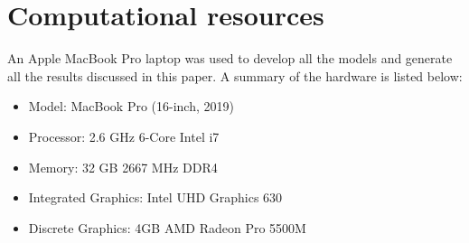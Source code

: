 
\section{Computational resources}

An Apple MacBook Pro laptop was used to develop all the models and generate all the results discussed in this paper. A summary of the hardware is listed below:

\begin{itemize}
    \item Model: MacBook Pro (16-inch, 2019)
    \item Processor: 2.6 GHz 6-Core Intel i7
    \item Memory: 32 GB 2667 MHz DDR4
    \item Integrated Graphics: Intel UHD Graphics 630
    \item Discrete Graphics: 4GB AMD Radeon Pro 5500M
\end{itemize}
